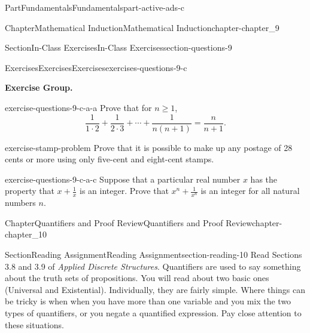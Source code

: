 \documentclass[oneside,10pt,]{book}
\numberwithin{equation}{section}
\begin{document}
\begin{partptx}{Part}{Fundamentals}{}{Fundamentals}{}{}{part-active-ads-c}
\begin{chapterptx}{Chapter}{Mathematical Induction}{}{Mathematical Induction}{}{}{chapter-chapter_9}
\begin{sectionptx}{Section}{In-Class Exercises}{}{In-Class Exercises}{}{}{section-questions-9}
%
%
%
\typeout{************************************************}
\typeout{************************************************}
%
\begin{exercises-subsection-numberless}{Exercises}{Exercises}{}{Exercises}{}{}{exercises-questions-9-c}
\par\medskip\noindent%
\textbf{Exercise Group.}\space\space%
\begin{exercisegroup}
\begin{divisionexerciseeg}{1}{}{}{exercise-questions-9-c-a-a}%
Prove that for \(n\geq 1\),%
\begin{equation*}
\frac{1}{1\cdot 2 }+ \frac{1}{2\cdot 3}+ \cdots  + \frac{1}{n(n+1)}= \frac{n}{n+1}.
\end{equation*}
%
\end{divisionexerciseeg}%
\begin{divisionexerciseeg}{2}{}{}{exercise-stamp-problem}%
Prove that it is possible to make up any postage of 28 cents or more using only five-cent and eight-cent stamps.%
\end{divisionexerciseeg}%
\begin{divisionexerciseeg}{3}{}{}{exercise-questions-9-c-a-c}%
Suppose that a particular real number \(x\) has the property that \(x + \frac{1}{x}\) is an integer.  Prove that \(x^n + \frac{1}{x^n}\) is an integer for all natural numbers \(n\).%
\end{divisionexerciseeg}%
\end{exercisegroup}
\par\medskip\noindent
\end{exercises-subsection-numberless}
\end{sectionptx}
\end{chapterptx}
%
\typeout{************************************************}
\typeout{************************************************}
%
\begin{chapterptx}{Chapter}{Quantifiers and Proof Review}{}{Quantifiers and Proof Review}{}{}{chapter-chapter_10}
\renewcommand*{\chaptername}{Chapter}
\index{}%
%
%
\typeout{************************************************}
\typeout{************************************************}
%
\begin{sectionptx}{Section}{Reading Assignment}{}{Reading Assignment}{}{}{section-reading-10}
Read Sections 3.8 and 3.9 of \emph{Applied Discrete Structures}.  Quantifiers are used to say something about the truth sets of propositions.  You will read about two basic ones (Universal and Existential).  Individually, they are fairly simple.  Where things can be tricky is when when you have more than one variable and you mix the two types of quantifiers, or you negate a quantified expression.  Pay close attention to these situations.%

\end{sectionptx}
\end{chapterptx}
\end{partptx}
\end{document}
